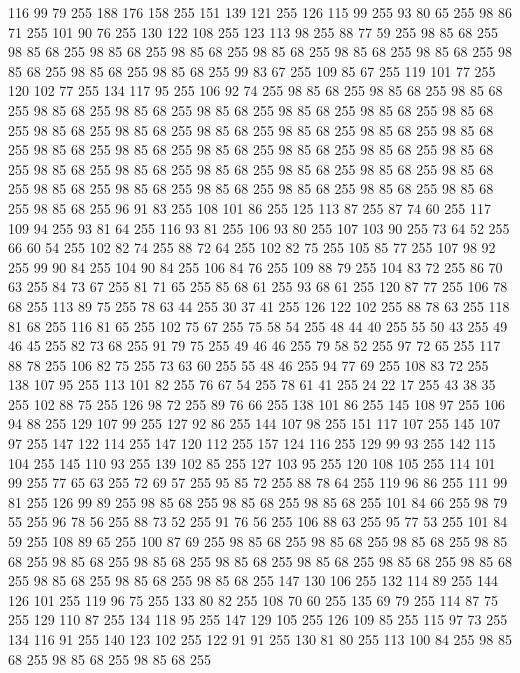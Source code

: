 116 99 79 255 188 176 158 255 151 139 121 255 126 115 99 255 93 80 65 255 98 86 71 255 101 90 76 255 130 122 108 255 123 113 98 255 88 77 59 255 98 85 68 255 98 85 68 255 98 85 68 255 98 85 68 255 98 85 68 255 98 85 68 255 98 85 68 255 98 85 68 255 98 85 68 255 98 85 68 255 99 83 67 255 109 85 67 255 119 101 77 255 120 102 77 255 134 117 95 255 106 92 74 255 98 85 68 255 98 85 68 255 98 85 68 255 98 85 68 255 98 85 68 255 98 85 68 255 98 85 68 255 98 85 68 255 98 85 68 255 98 85 68 255 98 85 68 255 98 85 68 255 98 85 68 255 98 85 68 255 98 85 68 255 98 85 68 255 98 85 68 255 98 85 68 255 98 85 68 255 98 85 68 255 98 85 68 255 98 85 68 255 98 85 68 255 98 85 68 255 98 85 68 255 98 85 68 255 98 85 68 255 98 85 68 255 98 85 68 255 98 85 68 255 98 85 68 255 98 85 68 255 98 85 68 255 98 85 68 255 96 91 83 255 108 101 86 255 125 113 87 255 87 74 60 255
117 109 94 255 93 81 64 255 116 93 81 255 106 93 80 255 107 103 90 255 73 64 52 255 66 60 54 255 102 82 74 255 88 72 64 255 102 82 75 255 105 85 77 255 107 98 92 255 99 90 84 255 104 90 84 255 106 84 76 255 109 88 79 255 104 83 72 255 86 70 63 255 84 73 67 255 81 71 65 255 85 68 61 255 93 68 61 255 120 87 77 255 106 78 68 255 113 89 75 255 78 63 44 255 30 37 41 255 126 122 102 255 88 78 63 255 118 81 68 255 116 81 65 255 102 75 67 255 75 58 54 255 48 44 40 255 55 50 43 255 49 46 45 255 82 73 68 255 91 79 75 255 49 46 46 255 79 58 52 255 97 72 65 255 117 88 78 255 106 82 75 255 73 63 60 255 55 48 46 255 94 77 69 255 108 83 72 255 138 107 95 255 113 101 82 255 76 67 54 255 78 61 41 255 24 22 17 255 43 38 35 255 102 88 75 255 126 98 72 255 89 76 66 255 138 101 86 255 145 108 97 255 106 94 88 255 129 107 99 255 127 92 86 255 144 107 98 255 151 117 107 255 145 107 97 255
147 122 114 255 147 120 112 255 157 124 116 255 129 99 93 255 142 115 104 255 145 110 93 255 139 102 85 255 127 103 95 255 120 108 105 255 114 101 99 255 77 65 63 255 72 69 57 255 95 85 72 255 88 78 64 255 119 96 86 255 111 99 81 255 126 99 89 255 98 85 68 255 98 85 68 255 98 85 68 255 101 84 66 255 98 79 55 255 96 78 56 255 88 73 52 255 91 76 56 255 106 88 63 255 95 77 53 255 101 84 59 255 108 89 65 255 100 87 69 255 98 85 68 255 98 85 68 255 98 85 68 255 98 85 68 255 98 85 68 255 98 85 68 255 98 85 68 255 98 85 68 255 98 85 68 255 98 85 68 255 98 85 68 255 98 85 68 255 98 85 68 255 147 130 106 255 132 114 89 255 144 126 101 255 119 96 75 255 133 80 82 255 108 70 60 255 135 69 79 255 114 87 75 255 129 110 87 255 134 118 95 255 147 129 105 255 126 109 85 255 115 97 73 255 134 116 91 255 140 123 102 255 122 91 91 255 130 81 80 255 113 100 84 255 98 85 68 255 98 85 68 255 98 85 68 255
